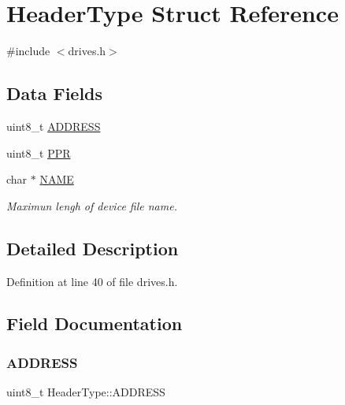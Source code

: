 \hypertarget{structHeaderType}{}\section{Header\+Type Struct Reference}
\label{structHeaderType}


{\ttfamily \#include $<$drives.\+h$>$}

\subsection*{Data Fields}
\begin{DoxyCompactItemize}
\item 
uint8\+\_\+t \hyperlink{structHeaderType_a70edfd477c537b2fa51c1aa63fcc7bee}{A\+D\+D\+R\+E\+SS}
\item 
uint8\+\_\+t \hyperlink{structHeaderType_ac642cdad0f3874495afa0ab687a56fd0}{P\+PR}
\item 
char $\ast$ \hyperlink{structHeaderType_a51c3f7025d3bc22c479e44f158471537}{N\+A\+ME}
\begin{DoxyCompactList}\small\item\em Maximun lengh of device file name. \end{DoxyCompactList}\end{DoxyCompactItemize}


\subsection{Detailed Description}


Definition at line 40 of file drives.\+h.



\subsection{Field Documentation}
\mbox{\label{structHeaderType_a70edfd477c537b2fa51c1aa63fcc7bee}} 
\subsubsection{\texorpdfstring{A\+D\+D\+R\+E\+SS}{ADDRESS}}
{\footnotesize\ttfamily uint8\+\_\+t Header\+Type\+::\+A\+D\+D\+R\+E\+SS}



